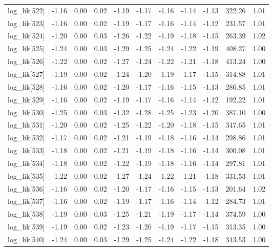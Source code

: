\begin{table}[ht]
\begin{tabular}{rrrrrrrrrrr}
  log\_lik[522] & -1.16 & 0.00 & 0.02 & -1.19 & -1.17 & -1.16 & -1.14 & -1.13 & 322.26 & 1.01 \\ 
  log\_lik[523] & -1.16 & 0.00 & 0.02 & -1.19 & -1.17 & -1.16 & -1.14 & -1.12 & 231.57 & 1.01 \\ 
  log\_lik[524] & -1.20 & 0.00 & 0.03 & -1.26 & -1.22 & -1.19 & -1.18 & -1.15 & 263.39 & 1.02 \\ 
  log\_lik[525] & -1.24 & 0.00 & 0.03 & -1.29 & -1.25 & -1.24 & -1.22 & -1.19 & 408.27 & 1.00 \\ 
  log\_lik[526] & -1.22 & 0.00 & 0.02 & -1.27 & -1.24 & -1.22 & -1.21 & -1.18 & 413.24 & 1.00 \\ 
  log\_lik[527] & -1.19 & 0.00 & 0.02 & -1.24 & -1.20 & -1.19 & -1.17 & -1.15 & 314.88 & 1.01 \\ 
  log\_lik[528] & -1.16 & 0.00 & 0.02 & -1.20 & -1.17 & -1.16 & -1.15 & -1.13 & 286.85 & 1.01 \\ 
  log\_lik[529] & -1.16 & 0.00 & 0.02 & -1.19 & -1.17 & -1.16 & -1.14 & -1.12 & 192.22 & 1.01 \\ 
  log\_lik[530] & -1.25 & 0.00 & 0.03 & -1.32 & -1.28 & -1.25 & -1.23 & -1.20 & 387.10 & 1.00 \\ 
  log\_lik[531] & -1.20 & 0.00 & 0.02 & -1.25 & -1.22 & -1.20 & -1.18 & -1.15 & 347.65 & 1.01 \\ 
  log\_lik[532] & -1.17 & 0.00 & 0.02 & -1.21 & -1.19 & -1.18 & -1.16 & -1.14 & 298.86 & 1.01 \\ 
  log\_lik[533] & -1.18 & 0.00 & 0.02 & -1.21 & -1.19 & -1.18 & -1.16 & -1.14 & 300.08 & 1.01 \\ 
  log\_lik[534] & -1.18 & 0.00 & 0.02 & -1.22 & -1.19 & -1.18 & -1.16 & -1.14 & 297.81 & 1.01 \\ 
  log\_lik[535] & -1.22 & 0.00 & 0.02 & -1.27 & -1.24 & -1.22 & -1.21 & -1.18 & 331.53 & 1.01 \\ 
  log\_lik[536] & -1.16 & 0.00 & 0.02 & -1.20 & -1.17 & -1.16 & -1.15 & -1.13 & 201.64 & 1.02 \\ 
  log\_lik[537] & -1.16 & 0.00 & 0.02 & -1.19 & -1.17 & -1.16 & -1.14 & -1.12 & 284.73 & 1.01 \\ 
  log\_lik[538] & -1.19 & 0.00 & 0.03 & -1.25 & -1.21 & -1.19 & -1.17 & -1.14 & 374.59 & 1.00 \\ 
  log\_lik[539] & -1.19 & 0.00 & 0.02 & -1.23 & -1.20 & -1.19 & -1.17 & -1.15 & 313.35 & 1.00 \\ 
  log\_lik[540] & -1.24 & 0.00 & 0.03 & -1.29 & -1.25 & -1.24 & -1.22 & -1.18 & 343.53 & 1.00 \\ 

\end{tabular}
\end{table}
